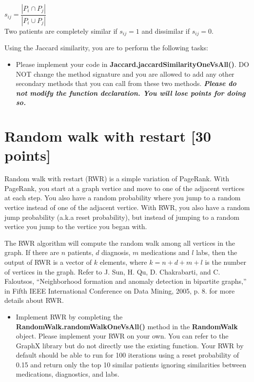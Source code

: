 \documentclass[12pt]{article}
\begin{document}
$ s_{ij} = \dfrac{|P_i \cap P_j|}{|P_i \cup P_j|} $ \\

Two patients are completely similar if $ s_{ij} = 1 $ and dissimilar if $ s_{ij} = 0 $.

\noindent Using the Jaccard similarity, you are to perform the following tasks:
\begin{itemize}
\item Please implement your code in \textbf{Jaccard.jaccardSimilarityOneVsAll()}. DO NOT change the method signature and you are allowed to add any other secondary methods that you can call from these two methods. \textbf{\textit{Please do not modify the function declaration. You will lose points for doing so.}}
\end{itemize}

\section{Random walk with restart [30 points]}
Random walk with restart (RWR) is a simple variation of PageRank. With PageRank, you start at a graph vertice and move to one of the adjacent vertices at each step. You also have a random probability where you jump to a random vertice instead of one of the adjacent vertice. With RWR, you also have a random jump probability (a.k.a reset probability), but instead of jumping to a random vertice you jump to the vertice you began with.

The RWR algorithm will compute the random walk among all vertices in the graph. If there are $n$ patients, $d$ diagnosis, $m$ medications and $l$ labs, then the output of RWR is a vector of $ k $ elements, where $k = n + d + m + l$ is the number of vertices in the graph. Refer to J. Sun, H. Qu, D. Chakrabarti, and C. Faloutsos, “Neighborhood formation and anomaly detection in bipartite graphs,” in Fifth IEEE International Conference on Data Mining, 2005, p. 8. for more details about RWR.

\begin{itemize}
\item Implement RWR by completing the \textbf{RandomWalk.randomWalkOneVsAll()} method in the \textbf{RandomWalk} object. Please implement your RWR on your own. You can refer to the GraphX library but do not directly use the existing function. Your RWR by default should be able to run for 100 iterations using a reset probability of 0.15 and return only the top 10 similar patients ignoring similarities between medications, diagnostics, and labs.
\end{itemize}
\end{document}

